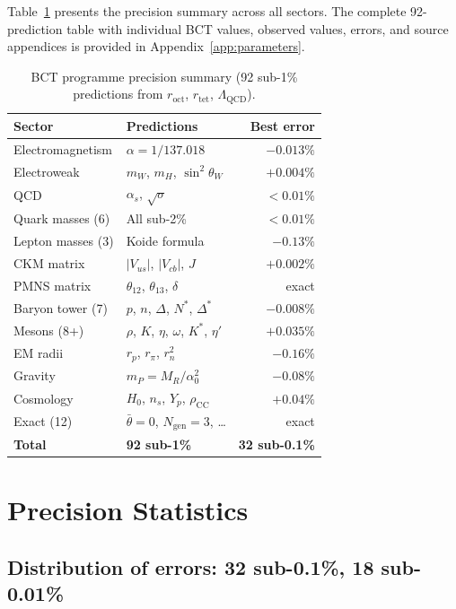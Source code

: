 \documentclass[review,number,sort&compress]{elsarticle}
\newcommand{\roct}{r_{\mathrm{oct}}}
\newcommand{\rtet}{r_{\mathrm{tet}}}
\newcommand{\azero}{\alpha_0}
\newcommand{\LQCD}{\Lambda_{\mathrm{QCD}}}
\newcommand{\thetabar}{\bar{\theta}}
\newcommand{\MR}{M_R}
\newcommand{\mP}{m_P}
\begin{document}
Table~\ref{tab:global} presents the precision summary across all sectors.
The complete 92-prediction table with individual BCT values, observed
values, errors, and source appendices is provided in
Appendix~\ref{app:parameters}.

\begin{table}[h]
\caption{\label{tab:global}%
BCT programme precision summary (92 sub-1\% predictions from
$\roct$, $\rtet$, $\LQCD$).}
\begin{tabular}{@{}llr@{}}
\toprule
Sector & Predictions & Best error \\
\midrule
Electromagnetism & $\alpha = 1/137.018$ & $-0.013\%$ \\
Electroweak & $m_W$, $m_H$, $\sin^2\theta_W$ & $+0.004\%$ \\
QCD & $\alpha_s$, $\sqrt{\sigma}$ & $< 0.01\%$ \\
Quark masses (6) & All sub-2\% & $< 0.01\%$ \\
Lepton masses (3) & Koide formula & $-0.13\%$ \\
CKM matrix & $|V_{us}|$, $|V_{cb}|$, $J$ & $+0.002\%$ \\
PMNS matrix & $\theta_{12}$, $\theta_{13}$, $\delta$ & exact \\
Baryon tower (7) & $p$, $n$, $\Delta$, $N^*$, $\Delta^*$ & $-0.008\%$ \\
Mesons (8+) & $\rho$, $K$, $\eta$, $\omega$, $K^*$, $\eta'$ & $+0.035\%$ \\
EM radii & $r_p$, $r_\pi$, $r_n^2$ & $-0.16\%$ \\
Gravity & $\mP = \MR/\azero^2$ & $-0.08\%$ \\
Cosmology & $H_0$, $n_s$, $Y_p$, $\rho_{\mathrm{CC}}$ & $+0.04\%$ \\
Exact (12) & $\thetabar = 0$, $N_{\mathrm{gen}} = 3$, \ldots & exact \\
\midrule
\textbf{Total} & \textbf{92 sub-1\%} & \textbf{32 sub-0.1\%} \\
\bottomrule
\end{tabular}
\end{table}

\section{Precision Statistics}
\label{sec:statistics}

\subsection{Distribution of errors: 32 sub-0.1\%, 18 sub-0.01\%}
\end{document}
